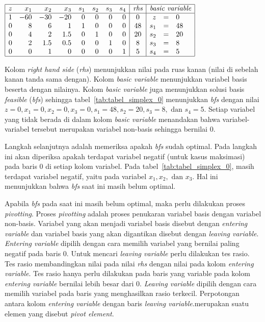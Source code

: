 \begin{center}
	\label{tab:tabel_simplex_0}
	$
	\begin{array}{|r r r r r r r r|c|r c l|}
		\hline
		z & x_1 & x_2 & x_3 & s_1 & s_2 & s_3 & s_4 & \textit{rhs} & \multicolumn{3}{c|}{\textit{basic variable}}\\
		\hline
		1 & -60 & -30 & -20 & 0 & 0 & 0 & 0 & 0 & z & = & 0\\
		0 & 8 & 6 & 1 & 1 & 0 & 0 & 0 & 48 & s_1 & = & 48\\
		0 & 4 & 2 & 1.5 & 0 & 1 & 0 & 0 & 20 & s_2 & = & 20\\
		0 & 2 & 1.5 & 0.5 & 0 & 0 & 1 & 0 & 8 & s_3 & = & 8\\
		0 & 0 & 1 & 0 & 0 & 0 & 0 & 1 & 5 & s_4 & = & 5\\
		\hline
	\end{array}
	$
\end{center}

Kolom \textit{right hand side} (\textit{rhs}) menunjukkan nilai pada ruas kanan (nilai di sebelah kanan tanda sama dengan). Kolom \textit{basic variable} menunjukkan variabel basis beserta dengan nilainya. Kolom \textit{basic variable} juga menunjukkan solusi basis \textit{feasible} (\textit{bfs}) sehingga tabel~\ref{tab:tabel_simplex_0} menunjukkan \textit{bfs} dengan nilai \(z=0, x_1=0, x_2=0, x_3=0, s_1=48, s_2=20, s_3=8, \text{ dan } s_4=5\). Setiap variabel yang tidak berada di dalam kolom \textit{basic variable} menandakan bahwa variabel-variabel tersebut merupakan variabel non-basis sehingga bernilai 0.

Langkah selanjutnya adalah memeriksa apakah \textit{bfs} sudah optimal. Pada langkah ini akan diperiksa apakah terdapat variabel negatif (untuk kasus maksimasi) pada baris 0 di setiap kolom variabel. Pada tabel~\ref{tab:tabel_simplex_0}, masih terdapat variabel negatif, yaitu pada variabel \(x_1, x_2, \text{ dan } x_3\).
Hal ini menunjukkan bahwa \textit{bfs} saat ini masih belum optimal.

Apabila \textit{bfs} pada saat ini masih belum optimal, maka perlu dilakukan proses \textit{pivotting}. Proses \textit{pivotting} adalah proses penukaran variabel basis dengan variabel non-basis. Variabel yang akan menjadi variabel basis disebut dengan \textit{entering variable} dan variabel basis yang akan digantikan disebut dengan \textit{leaving variable}. \textit{Entering variable} dipilih dengan cara memilih variabel yang bernilai paling negatif pada baris 0. Untuk mencari \textit{leaving variable} perlu dilakukan tes rasio. Tes rasio membandingkan nilai pada nilai \textit{rhs} dengan nilai pada kolom \textit{entering variable}. Tes rasio hanya perlu dilakukan pada baris yang variable pada kolom \textit{entering variable} bernilai lebih besar dari 0. \textit{Leaving variable} dipilih dengan cara memilih variabel pada baris yang menghasilkan rasio terkecil. Perpotongan antara kolom \textit{entering variable} dengan baris \textit{leaving variable}.merupakan suatu elemen yang disebut \textit{pivot element}.

